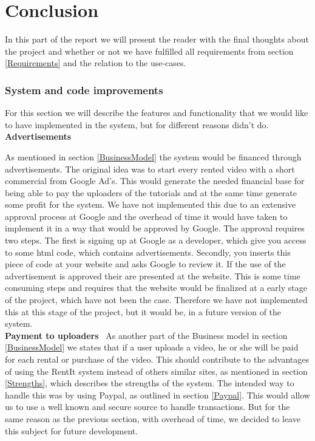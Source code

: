 \part{Conclusion}
In this part of the report we will present the reader with the final thoughts about the project and whether or not we have fulfilled all requirements from section \ref{Requirements} and the relation to the use-cases.

\section{System and code improvements}
For this section we will describe the features and functionality that we would like to have implemented in the system, but for different reasons didn't do.\\


\textbf{Advertisements} \

As mentioned in section \ref{BusinessModel} the system would be financed through advertisements. The original idea was to start every rented video with a short commercial from Google Ad's. This would generate the needed financial base for being able to pay the uploaders of the tutorials and at the same time generate some profit for the system. We have not implemented this due to an extensive approval process at Google and the overhead of time it would have taken to implement it in a way that would be approved by Google. The approval requires two steps. The first is signing up at Google as a developer, which give you access to some html code, which contains advertisements. Secondly, you inserts this piece of code at your website and asks Google to review it. If the use of the advertisement is approved their are presented at the website.  This is some time consuming steps and requires that the website would be finalized at a early stage of the project, which have not been the case. Therefore we have not implemented this at this stage of the project, but it would be, in a future version of the system. \\

\textbf{Payment to uploaders} \
 As another part of the Business model in section \ref{BusinessModel} we states that if a user uploads a video, he or she will be paid for each rental or purchase of the video. This should contribute to the advantages of using the RentIt system instead of others similar sites, as mentioned in section \ref{Strengths}, which describes the strengths of the system. The intended way to handle this was by using Paypal, as outlined in section \ref{Paypal}. This would allow us to use a well known and secure source to handle transactions. But for the same reason as the previous section, with overhead of time, we decided to leave this subject for future development.\\

